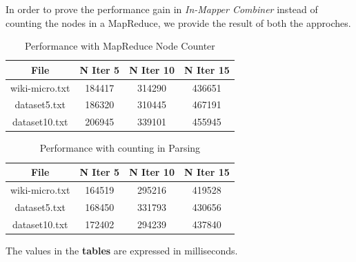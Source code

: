 In order to prove the performance gain in \textit{In-Mapper Combiner} instead of counting the nodes in a MapReduce, we provide the result of both the approches.

\begin{table}[H]
\caption{Performance with MapReduce Node Counter}
\centering
\begin{tabular}{c c c c}
\hline\hline
File & N Iter 5 & N Iter 10 & N Iter 15 \\ [0.7ex] %
\hline
wiki-micro.txt&184417&314290&436651\\
dataset5.txt&186320&310445&467191 \\
dataset10.txt&206945&339101&455945 \\ [1ex]
\hline
\end{tabular}
\label{table:nonlin}
\end{table}

\begin{table}[H]
\caption{Performance with counting in Parsing}
\centering
\begin{tabular}{c c c c}
\hline\hline
File & N Iter 5 & N Iter 10 & N Iter 15 \\ [0.7ex] %
\hline
wiki-micro.txt&164519&295216&419528\\
dataset5.txt&168450&331793&430656 \\
dataset10.txt&172402&294239&437840 \\ [1ex]
\hline
\end{tabular}
\label{table:nonlin}
\end{table}

\noindent The values in the \textbf{tables} are expressed in milliseconds.